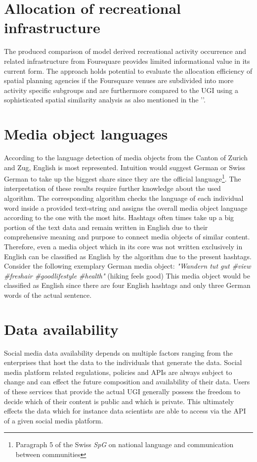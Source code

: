 \section{Allocation of recreational infrastructure} \label{discussion_foursquare}
The produced comparison of model derived recreational activity occurrence and related infrastructure from Foursquare provides limited informational value in its current form. The approach holds potential to evaluate the allocation efficiency of spatial planning agencies if the Foursquare venues are subdivided into more activity specific subgroups and are furthermore compared to the UGI using a sophisticated spatial similarity analysis as also mentioned in the ''.

\section{Media object languages}
According to the language detection of media objects from the Canton of Zurich and Zug, English is most represented. Intuition would suggest German or Swiss German to take up the biggest share since they are the official language\footnote{Paragraph 5 of the Swiss \textit{SpG} on national language and communication between communities}. The interpretation of these results require further knowledge about the used algorithm. The corresponding algorithm checks the language of each individual word inside a provided text-string and assigns the overall media object language according to the one with the most hits. Hashtags often times take up a big portion of the text data and remain written in English due to their comprehensive meaning and purpose to connect media objects of similar content. Therefore, even a media object which in its core was not written exclusively in English can be classified as English by the algorithm due to the present hashtags. Consider the following exemplary German media object: \textit{"Wandern tut gut \#view \#freshair \#goodlifestyle \#health"} (hiking feels good) This media object would be classified as English since there are four English hashtags and only three German words of the actual sentence.

\section{Data availability}
Social media data availability depends on multiple factors ranging from the enterprises that host the data to the individuals that generate the data. Social media platform related regulations, policies and APIs are always subject to change and can effect the future composition and availability of their data. Users of these services that provide the actual UGI generally possess the freedom to decide which of their content is public and which is private. This ultimately effects the data which for instance data scientists are able to access via the API of a given social media platform.

